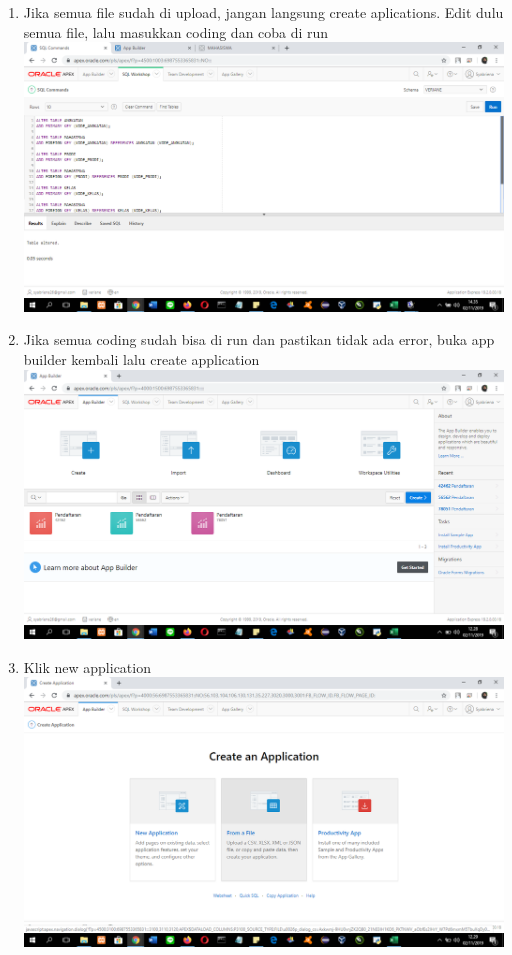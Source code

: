 \begin{enumerate}
\item Jika semua file sudah di upload, jangan langsung create aplications. Edit dulu semua file, lalu masukkan coding dan coba di run\\
\includegraphics[scale= 0.3]{gambar/gambar17.png}\\

\item Jika semua coding sudah bisa di run dan pastikan tidak ada error, buka app builder kembali lalu create application\\
\includegraphics[scale= 0.3]{gambar/gambar6.png}\\

\item Klik new application\\
\includegraphics[scale= 0.3]{gambar/gambar7.png}\\


\end{enumerate}
